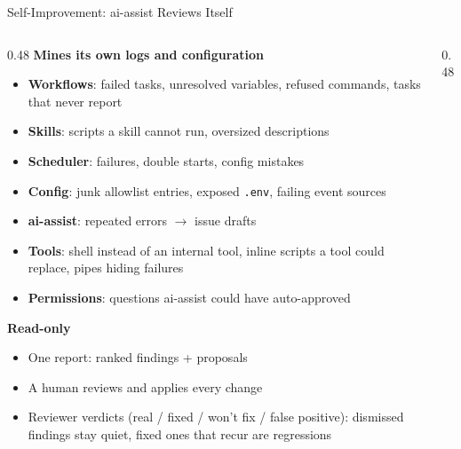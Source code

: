 \documentclass[aspectratio=169,10pt]{beamer}
\begin{document}
\begin{frame}[fragile]{Self-Improvement: ai-assist Reviews Itself}
\begin{columns}[T]
\begin{column}{0.48\textwidth}
\textbf{Mines its own logs and configuration}
\begin{itemize}\scriptsize\setlength{\itemsep}{0pt}
  \item \textbf{Workflows}: failed tasks, unresolved variables, refused commands, tasks that never report
  \item \textbf{Skills}: scripts a skill cannot run, oversized descriptions
  \item \textbf{Scheduler}: failures, double starts, config mistakes
  \item \textbf{Config}: junk allowlist entries, exposed \texttt{.env}, failing event sources
  \item \textbf{ai-assist}: repeated errors $\rightarrow$ issue drafts
  \item \textbf{Tools}: shell instead of an internal tool, inline scripts a tool could replace, pipes hiding failures
  \item \textbf{Permissions}: questions ai-assist could have auto-approved
\end{itemize}

\smallskip
\textbf{Read-only}
\begin{itemize}\scriptsize\setlength{\itemsep}{1pt}
  \item One report: ranked findings + proposals
  \item A human reviews and applies every change
  \item Reviewer verdicts (real / fixed / won't fix / false positive): dismissed findings stay quiet, fixed ones that recur are regressions
\end{itemize}
\end{column}
\begin{column}{0.48\textwidth}
\centering
{}


\end{column}
\end{columns}
\end{frame}
\end{document}
